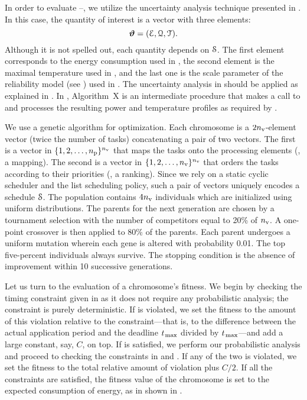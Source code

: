 In order to evaluate --, we utilize the uncertainty analysis technique presented in .
In this case, the quantity of interest is a vector with three elements:
\begin{equation} \elab{quantity-of-interest}
  \vw = (\qoiE, \qoiQ, \qoiT).
\end{equation}
Although it is not spelled out, each quantity depends on $\EuScript{S}$.
The first element corresponds to the energy consumption used in , the second element is the maximal temperature used in , and the last one is the scale parameter of the reliability model (see ) used in .
The uncertainty analysis in  should be applied as explained in .
In , Algorithm~X is an intermediate procedure that makes a call to  and processes the resulting power and temperature profiles as required by .

We use a genetic algorithm for optimization.
Each chromosome is a $2 {n_\text{v}}$-element vector (twice the number of tasks) concatenating a pair of two vectors.
The first is a vector in $\{ 1, 2, \dotsc, {n_\text{p}} \}^{n_\text{v}}$ that maps the tasks onto the processing elements (\ie, a mapping).
The second is a vector in $\{ 1, 2, \dotsc, {n_\text{v}} \}^{n_\text{v}}$ that orders the tasks according to their priorities (\ie, a ranking).
Since we rely on a static cyclic scheduler and the list scheduling policy, such a pair of vectors uniquely encodes a schedule $\EuScript{S}$.
The population contains $4 {n_\text{v}}$ individuals which are initialized using uniform distributions.
The parents for the next generation are chosen by a tournament selection with the number of competitors equal to 20\% of ${n_\text{v}}$.
A one-point crossover is then applied to 80\% of the parents.
Each parent undergoes a uniform mutation wherein each gene is altered with probability 0.01.
The top five-percent individuals always survive.
The stopping condition is the absence of improvement within 10 successive generations.

Let us turn to the evaluation of a chromosome's fitness.
We begin by checking the timing constraint given in  as it does not require any probabilistic analysis; the constraint is purely deterministic.
If  is violated, we set the fitness to the amount of this violation relative to the constraint---that is, to the difference between the actual application period and the deadline $t_{\text{\kern0.1emmax}}$ divided by $t_{\text{\kern0.1emmax}}$---and add a large constant, say, $C$, on top.
If  is satisfied, we perform our probabilistic analysis and proceed to checking the constraints in  and .
If any of the two is violated, we set the fitness to the total relative amount of violation plus $C/2$.
If all the constraints are satisfied, the fitness value of the chromosome is set to the expected consumption of energy, as in shown in .

